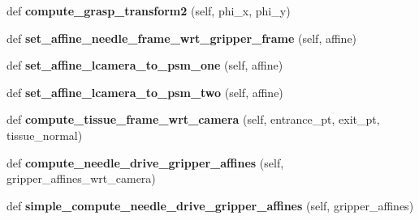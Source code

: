 \begin{DoxyCompactItemize}
\item 
def {\bfseries compute\+\_\+grasp\+\_\+transform2} (self, phi\+\_\+x, phi\+\_\+y)\hypertarget{classneedle__planner__camera__working_1_1needle__planner_afd1ecadcf0a553b88088be9b6c2af4e8}{}\label{classneedle__planner__camera__working_1_1needle__planner_afd1ecadcf0a553b88088be9b6c2af4e8}

\item 
def {\bfseries set\+\_\+affine\+\_\+needle\+\_\+frame\+\_\+wrt\+\_\+gripper\+\_\+frame} (self, affine)\hypertarget{classneedle__planner__camera__working_1_1needle__planner_a3e029e4c664e3529fdc8da751330ba5f}{}\label{classneedle__planner__camera__working_1_1needle__planner_a3e029e4c664e3529fdc8da751330ba5f}

\item 
def {\bfseries set\+\_\+affine\+\_\+lcamera\+\_\+to\+\_\+psm\+\_\+one} (self, affine)\hypertarget{classneedle__planner__camera__working_1_1needle__planner_a5a6fd460bd06fbb423936bc3eb1ce112}{}\label{classneedle__planner__camera__working_1_1needle__planner_a5a6fd460bd06fbb423936bc3eb1ce112}

\item 
def {\bfseries set\+\_\+affine\+\_\+lcamera\+\_\+to\+\_\+psm\+\_\+two} (self, affine)\hypertarget{classneedle__planner__camera__working_1_1needle__planner_a80c1d5bc2c51e53251f71b612283b84b}{}\label{classneedle__planner__camera__working_1_1needle__planner_a80c1d5bc2c51e53251f71b612283b84b}

\item 
def {\bfseries compute\+\_\+tissue\+\_\+frame\+\_\+wrt\+\_\+camera} (self, entrance\+\_\+pt, exit\+\_\+pt, tissue\+\_\+normal)\hypertarget{classneedle__planner__camera__working_1_1needle__planner_af90b81eedcc17120ce26a55840a13ed9}{}\label{classneedle__planner__camera__working_1_1needle__planner_af90b81eedcc17120ce26a55840a13ed9}

\item 
def {\bfseries compute\+\_\+needle\+\_\+drive\+\_\+gripper\+\_\+affines} (self, gripper\+\_\+affines\+\_\+wrt\+\_\+camera)\hypertarget{classneedle__planner__camera__working_1_1needle__planner_a9360201ec7e15ca674a8e92708348d9e}{}\label{classneedle__planner__camera__working_1_1needle__planner_a9360201ec7e15ca674a8e92708348d9e}

\item 
def {\bfseries simple\+\_\+compute\+\_\+needle\+\_\+drive\+\_\+gripper\+\_\+affines} (self, gripper\+\_\+affines)\hypertarget{classneedle__planner__camera__working_1_1needle__planner_ad28b7db89f3070945269398bca9d7766}{}\label{classneedle__planner__camera__working_1_1needle__planner_ad28b7db89f3070945269398bca9d7766}


\end{DoxyCompactItemize}
